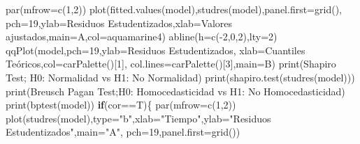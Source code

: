 \documentclass[
]{article}
\newenvironment{Shaded}{\begin{snugshade}}{\end{snugshade}}
\newcommand{\AttributeTok}[1]{\textcolor[rgb]{0.77,0.63,0.00}{#1}}
\newcommand{\ControlFlowTok}[1]{\textcolor[rgb]{0.13,0.29,0.53}{\textbf{#1}}}
\newcommand{\DecValTok}[1]{\textcolor[rgb]{0.00,0.00,0.81}{#1}}
\newcommand{\FunctionTok}[1]{\textcolor[rgb]{0.00,0.00,0.00}{#1}}
\newcommand{\NormalTok}[1]{#1}
\newcommand{\SpecialCharTok}[1]{\textcolor[rgb]{0.00,0.00,0.00}{#1}}
\newcommand{\StringTok}[1]{\textcolor[rgb]{0.31,0.60,0.02}{#1}}
\begin{document}
\begin{Shaded}
\begin{Highlighting}[]
  \FunctionTok{par}\NormalTok{(}\AttributeTok{mfrow=}\FunctionTok{c}\NormalTok{(}\DecValTok{1}\NormalTok{,}\DecValTok{2}\NormalTok{))}
  \FunctionTok{plot}\NormalTok{(}\FunctionTok{fitted.values}\NormalTok{(model),}\FunctionTok{studres}\NormalTok{(model),}\AttributeTok{panel.first=}\FunctionTok{grid}\NormalTok{(),}
       \AttributeTok{pch=}\DecValTok{19}\NormalTok{,}\AttributeTok{ylab=}\StringTok{\textquotesingle{}Residuos Estudentizados\textquotesingle{}}\NormalTok{,}\AttributeTok{xlab=}\StringTok{\textquotesingle{}Valores ajustados\textquotesingle{}}\NormalTok{,}\AttributeTok{main=}\StringTok{\textquotesingle{}A\textquotesingle{}}\NormalTok{,}\AttributeTok{col=}\StringTok{\textquotesingle{}aquamarine4\textquotesingle{}}\NormalTok{)}
  \FunctionTok{abline}\NormalTok{(}\AttributeTok{h=}\FunctionTok{c}\NormalTok{(}\SpecialCharTok{{-}}\DecValTok{2}\NormalTok{,}\DecValTok{0}\NormalTok{,}\DecValTok{2}\NormalTok{),}\AttributeTok{lty=}\DecValTok{2}\NormalTok{)}
  \FunctionTok{qqPlot}\NormalTok{(model,}\AttributeTok{pch=}\DecValTok{19}\NormalTok{,}\AttributeTok{ylab=}\StringTok{\textquotesingle{}Residuos Estudentizados\textquotesingle{}}\NormalTok{,}
         \AttributeTok{xlab=}\StringTok{\textquotesingle{}Cuantiles Teóricos\textquotesingle{}}\NormalTok{,}\AttributeTok{col=}\FunctionTok{carPalette}\NormalTok{()[}\DecValTok{1}\NormalTok{],}
         \AttributeTok{col.lines=}\FunctionTok{carPalette}\NormalTok{()[}\DecValTok{3}\NormalTok{],}\AttributeTok{main=}\StringTok{\textquotesingle{}B\textquotesingle{}}\NormalTok{)}
  \FunctionTok{print}\NormalTok{(}\StringTok{\textquotesingle{}Shapiro Test; H0: Normalidad vs H1: No Normalidad\textquotesingle{}}\NormalTok{)}
  \FunctionTok{print}\NormalTok{(}\FunctionTok{shapiro.test}\NormalTok{(}\FunctionTok{studres}\NormalTok{(model)))}
  \FunctionTok{print}\NormalTok{(}\StringTok{\textquotesingle{}Breusch Pagan Test;H0: Homocedasticidad vs H1: No Homocedasticidad\textquotesingle{}}\NormalTok{)}
  \FunctionTok{print}\NormalTok{(}\FunctionTok{bptest}\NormalTok{(model))}
  \ControlFlowTok{if}\NormalTok{(cor}\SpecialCharTok{==}\NormalTok{T)\{}
    \FunctionTok{par}\NormalTok{(}\AttributeTok{mfrow=}\FunctionTok{c}\NormalTok{(}\DecValTok{1}\NormalTok{,}\DecValTok{2}\NormalTok{))}
    \FunctionTok{plot}\NormalTok{(}\FunctionTok{studres}\NormalTok{(model),}\AttributeTok{type=}\StringTok{"b"}\NormalTok{,}\AttributeTok{xlab=}\StringTok{"Tiempo"}\NormalTok{,}\AttributeTok{ylab=}\StringTok{"Residuos Estudentizados"}\NormalTok{,}\AttributeTok{main=}\StringTok{"A"}\NormalTok{,}
         \AttributeTok{pch=}\DecValTok{19}\NormalTok{,}\AttributeTok{panel.first=}\FunctionTok{grid}\NormalTok{())}

\end{Highlighting}
\end{Shaded}
\end{document}
